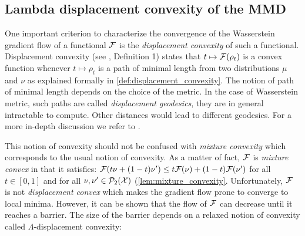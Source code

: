 


\subsection{Lambda displacement convexity of the MMD}\label{subsection:barrier_optimization}
One important criterion to characterize the convergence of the Wasserstein gradient flow of a functional ${{\mathcal F}}$ is the \textit{displacement convexity} of such a functional. Displacement convexity (see \cite{Villani:2004}, Definition 1) states that $t\mapsto {{\mathcal F}}(\rho_t)$ is a convex function whenever $t\mapsto\rho_t$ is a path of minimal length from two distributions $\mu$ and $\nu$ as explained formally in \cref{def:displacement_convexity}. The notion of path of minimal length depends on the choice of the metric. In the case of Wasserstein metric, such paths are called  \textit{displacement geodesics}, they are in general intractable to compute. Other distances would lead to different geodesics. For a more in-depth discussion we refer to \cite{Bottou:2017}.



This notion of convexity should not be confused with \textit{mixture convexity} which corresponds to the usual notion of convexity. As a matter of fact, ${{\mathcal F}}$ is \textit{mixture convex} in that it satisfies: ${{\mathcal F}}(t\nu +(1-t)\nu')\leq t{{\mathcal F}}(\nu)+(1-t){{\mathcal F}}(\nu')$ for all $t\in [0,1]$ and for all $\nu,\nu'\in\mathcal{P}_2({{\mathcal X}})$ (\cref{lem:mixture_convexity}. Unfortunately, ${{\mathcal F}}$ is not \textit{displacement convex} which makes the gradient flow prone to converge to local minima. However, it can be shown that the flow of ${{\mathcal F}}$ can decrease until it reaches a barrier. The size of the barrier depends on a relaxed notion of convexity called $\Lambda$-displacement convexity:

